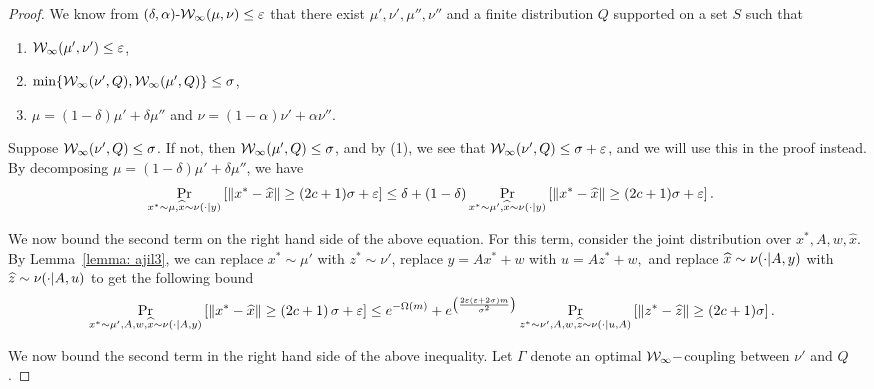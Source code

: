 \begin{proof}
	 We know from $(\delta, \alpha)\text{-}\mathcal W_{\infty} (\mu, \nu) \leq \varepsilon$ that there exist $\mu', \nu', \mu'', \nu''$  
	 and a finite distribution $Q$ supported on a set $S$ such that 
	\begin{enumerate}
		\item $\mathcal W_{\infty}(\mu', \nu') \leq \varepsilon$,
		\item $\min \{ \mathcal W_{\infty}(\nu', Q),\mathcal W_{\infty}(\mu', Q) \}  \leq \sigma$,
		\item $\mu = (1-\delta) \mu' + \delta \mu''$ and $\nu = (1-\alpha) \nu' + \alpha \nu''$.
	\end{enumerate}

	Suppose $\mathcal W_{\infty}(\nu', Q) \leq \sigma$. If not, then $\mathcal W_{\infty}(\mu', Q) \leq \sigma $, and by (1),  we see that $\mathcal W_{\infty}(\nu', Q) \leq \sigma + \varepsilon$, and we will use this in the proof instead. 
	By decomposing $\mu = (1- \delta) \mu' +  \delta \mu''$, we have
	\begin{align}\label{eqn: rp thm eqn 1}
	\Pr_{x^*\sim \mu , \widehat{x} \sim \nu( \cdot | y)} \left[ \|x^* - \widehat{x}\| \geq (2c+1) \sigma + \varepsilon \right] &
	\leq \delta + (1-\delta) \Pr_{x^*\sim \mu' ,\widehat{x} \sim \nu( \cdot | y)} \left[ \|x^* - \widehat{x}\| \geq (2 c+1) \sigma + \varepsilon \right].
  \end{align}

	We now bound the second term on the right hand side of the above equation.
	For this term, consider the joint distribution over $x^*, A , w, \widehat{x}$.
	By Lemma~\ref{lemma: ajil3},  we can replace $x^* \sim \mu'$ with $z^* \sim \nu'$, 
	replace $y = Ax^* + w$ with $u = A z^* + w,$ and 
	replace $\widehat{x} \sim \nu( \cdot | A,y)$ with $\widehat{z} \sim \nu( \cdot | A,u)$
	to get the following bound
  \begin{align}
    & \Pr_{x^*\sim \mu' , A , w, \widehat{x} \sim \nu( \cdot | A, y)} \left[ \|x^* - \widehat{x}\| \geq \left( 2 c + 1 \right)\sigma + \varepsilon \right] \leq e^{-\Omega(m)} + e^{\left( \frac{2\varepsilon\left( \varepsilon + 2\sigma \right)m}{\sigma^2} \right)}\Pr_{z^*\sim \nu', A , w, \widehat{z} \sim \nu(\cdot | u, A)}\left[ \| z^* - \widehat{z}\| \geq (2c+1)\sigma \right]\label{eqn: rp thm eqn 2}.
  \end{align}

    We now bound the second term in the right hand side of the above inequality.
    Let $\Gamma$ denote an optimal $\mathcal W_\infty-$coupling between $\nu'$ and $Q$. 


\end{proof}
